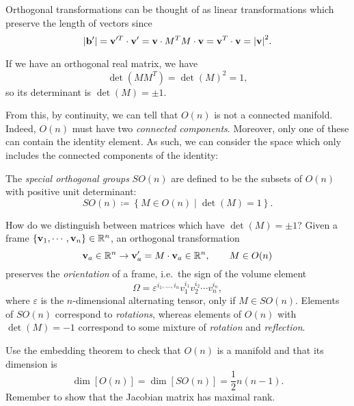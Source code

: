Orthogonal transformations can be thought of as linear transformations which preserve the length of vectors since
\begin{equation}
  \abs{\vb{b}'} = \vb{v}'^T \cdot \vb{v}' = \vb{v} \cdot M^T M \cdot \vb{v} = \vb{v}^T \cdot \vb{v} = \abs{\vb{v}}^2.
\end{equation}

If we have an orthogonal real matrix, we have
\begin{equation}
  \det(M M^T) = \det(M)^2 = 1,
\end{equation}
so its determinant is $\det(M) = \pm 1$.

From this, by continuity, we can tell that $O(n)$ is not a connected manifold. Indeed, $O(n)$ must have two \emph{connected components}. Moreover, only one of these can contain the identity element.
As such, we can consider the space which only includes the connected components of the identity:
\begin{definition}
  The \emph{special orthogonal groups} $SO(n)$ are defined to be the subsets of $O(n)$ with positive unit determinant:
\begin{equation}
  SO(n) \coloneqq \left\{ M \in O(n) \mid \det(M) = 1 \right\}.
\end{equation}
\end{definition}

How do we distinguish between matrices which have $\det(M) = \pm 1$?
Given a frame $\left\{ \vb{v}_1, \cdots, \vb{v}_n \right\} \in \mathbb{R}^n$, an orthogonal transformation
\begin{equation}
  \vb{v}_a \in \mathbb{R}^n \to \vb{v}_a' = M \cdot \vb{v}_a \in \mathbb{R}^n, \qquad M \in O(n)
\end{equation}
preserves the \emph{orientation} of a frame, i.e.~the sign of the volume element
\begin{equation}
  \Omega = \varepsilon^{i_1, \ldots, i_n} v_1^{i_1}v_2^{i_2} \cdots v_n^{i_n},
\end{equation}
where $\varepsilon$ is the $n$-dimensional alternating tensor, only if $M \in SO(n)$.
Elements of $SO(n)$ correspond to \emph{rotations}, whereas elements of $O(n)$ with $\det(M) = -1$ correspond to some mixture of \emph{rotation} and \emph{reflection}.

\begin{exercise}
  Use the embedding theorem to check that $O(n)$ is a manifold and that its dimension is
  \begin{equation}
    \dim[O(n)] = \dim[SO(n)] = \frac{1}{2}n(n-1).
  \end{equation}
  Remember to show that the Jacobian matrix has maximal rank.
\end{exercise}
